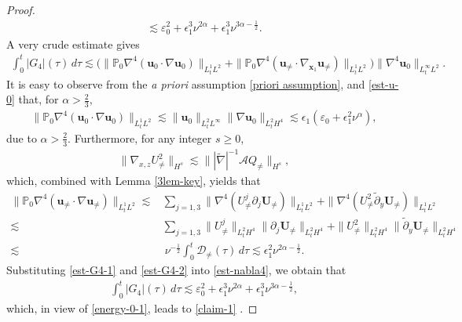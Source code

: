 \documentclass[11pt,reqno]{article}
\numberwithin{equation}{section}
\newcommand\R{{\mathbb R}}
\newcommand\PP{{\mathbb P}}
\newcommand\D{{\mathcal D}}
\newcommand\A{\mathcal{A}}
\newcommand\x{\bm{x}}
\newcommand\uu{\bm{u}}
\newcommand\U{\bm{U}}
\let\pa=\partial
\let\na=\nabla
\let\al=\alpha
\let\var=\varepsilon
\let\f=\frac
\let\ep=\epsilon
\begin{document}
\begin{proof}
\begin{align}
	\lesssim  \var_0^2
    +\ep_1^3\nu^{2\alpha}
    +\ep_1^3\nu^{3\alpha-\f12}.
\end{align}
A very crude estimate gives
\begin{align}\label{est-nabla4}
	\int_0^t|G_4|(\tau)\,d\tau
	\lesssim \big(\| \PP_0\nabla^4(\uu_{0}\cdot\nabla\uu_{0})\|_{L^1_tL^2}+
    \| \PP_0\nabla^4(\uu_{\not=}\cdot\nabla_{\x_1}\uu_{\not=})\|_{L^1_tL^2}\big)\|\nabla^4\uu_0\|_{L^\infty_tL^2}.
\end{align}
It is easy to observe from the \textit{a priori} assumption \eqref{priori assumption}, and \eqref{est-u-0} that, for $\alpha>\f23,$
\begin{align}
\label{est-G4-1}    
    \| \PP_0\nabla^4(\uu_{0}\cdot\nabla\uu_{0})\|_{L^1_tL^2}
    \lesssim   \|\uu_{0}\|_{L^2_tL^\infty}\|\na \uu_{0}\|_{L^2_tH^4}
    \lesssim 
    \ep_1(\var_0+\ep_1^2\nu^{\al}),
\end{align}
due to $\alpha>\f23$.
Furthermore, for any integer $s\geq0$,
\begin{align}\label{est-inviscid}
	\|\nabla_{x,z}U^2_{\not=}\|_{H^s}
	\lesssim
	\||\widetilde{\nabla}|^{-1}\A Q_{\not=}\|_{H^s},
\end{align}
which, combined with Lemma \ref{3lem-key}, yields that
\begin{align}
\label{est-G4-2}  
    \| \PP_0\nabla^4(\uu_{\not=}\cdot\nabla\uu_{\not=})\|_{L^1_tL^2}
    \lesssim &
    \sum_{j=1,3}\|\nabla^4(U_{\not=}^j\pa_j\U_{\not=})\|_{L^1_tL^{2}}
    +\|\nabla^4(U_{\not=}^2\tilde{\pa}_y\U_{\not=})\|_{L^1_tL^{2}}
    \nonumber
    \\
    \lesssim&
    \sum_{j=1,3}
    \|U_{\not=}^j\|_{L^2_tH^{4}}\|\pa_j\U_{\not=}\|_{L^2_tH^{4}}
    +\|U_{\not=}^2\|_{L^2_tH^{4}}\|\tilde\pa_y\U_{\not=}\|_{L^2_tH^{4}}
    \nonumber
    \\
    \lesssim&~
    \nu^{-\f12}\int_0^t \D_{\not=}(\tau)\,d\tau \lesssim \ep_1^2\nu^{2\al-\f12}.
\end{align}
Substituting \eqref{est-G4-1} and \eqref{est-G4-2} into \eqref{est-nabla4}, we obtain that
\begin{align*}%
	\int_0^t|G_4|(\tau)\,d\tau
	\lesssim \var_0^2+\ep_1^3\nu^{2\al}+\ep_1^3\nu^{3\al-\f12},
\end{align*}
which, in view of
\eqref{energy-0-1}, leads to \eqref{claim-1} .
\medskip


\end{proof}
\end{document}
